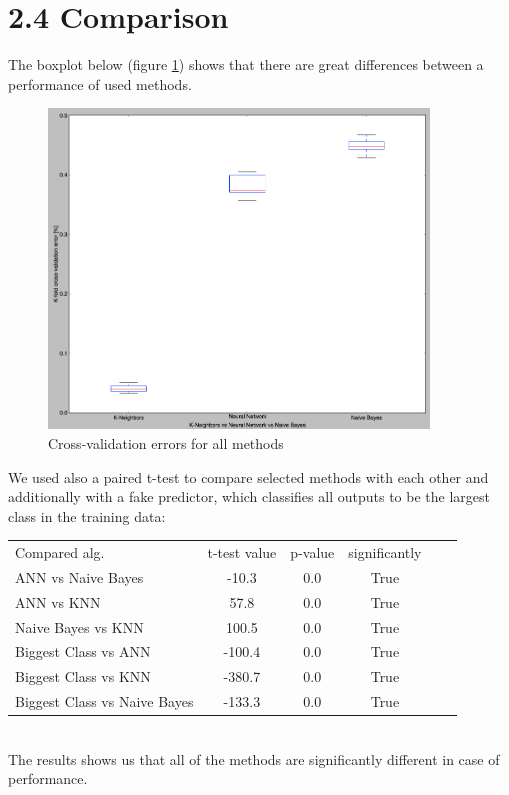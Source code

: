 \section*{2.4 Comparison}
The boxplot below (figure \ref{fig:cross_errors}) shows that there are great differences between a performance of used methods. 
\begin{figure}[!tbh]
	\centering
	\includegraphics[width=0.9\textwidth]{figures/cross_errors}
	\caption{Cross-validation errors for all methods}
	\label{fig:cross_errors}
\end{figure}
We used also a paired t-test to compare selected methods with each other and additionally with a fake predictor, which 
classifies all outputs to be the largest class in the training data: \\
\begin{tabular}{l*{4}{c}r}
Compared alg. & t-test value & p-value & significantly \\
ANN vs Naive Bayes & -10.3 & 0.0 & True \\
ANN vs KNN & 57.8 & 0.0 & True \\
Naive Bayes vs KNN & 100.5 & 0.0 & True \\
Biggest Class vs ANN & -100.4 & 0.0 & True \\
Biggest Class vs KNN & -380.7 & 0.0 & True \\
Biggest Class vs Naive Bayes & -133.3 & 0.0 & True \\
\end{tabular} \\
The results shows us that all of the methods are significantly different in case of performance.
